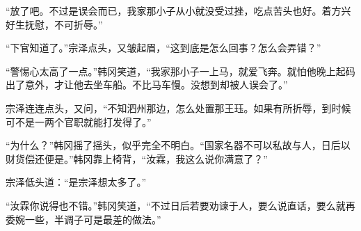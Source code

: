 “放了吧。不过是误会而已，我家那小子从小就没受过挫，吃点苦头也好。着方兴好生抚慰，不可折辱。”

“下官知道了。”宗泽点头，又皱起眉，“这到底是怎么回事？怎么会弄错？”

“警惕心太高了一点。”韩冈笑道，“我家那小子一上马，就爱飞奔。就怕他晚上起码出了意外，才让他去坐车船。不比马车慢。没想到却被人误会了。”

宗泽连连点头，又问，“不知泗州那边，怎么处置那王珏。如果有所折辱，到时候可不是一两个官职就能打发得了。”

“为什么？”韩冈摇了摇头，似乎完全不明白。“国家名器不可以私故与人，日后以财货偿还便是。”韩冈靠上椅背，“汝霖，我这么说你满意了？”

宗泽低头道：“是宗泽想太多了。”

“汝霖你说得也不错。”韩冈笑道，“不过日后若要劝谏于人，要么说直话，要么就再委婉一些，半调子可是最差的做法。”
